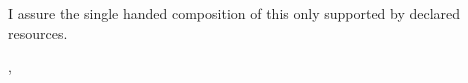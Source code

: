 \thispagestyle{empty}
\vspace*{0.8\textheight}
\noindent
I assure the single handed composition of this \MakeLowercase{\getDoctype{}} only supported by declared resources.

\vspace{15mm}
\noindent
\getSubmissionLocation{}, \getSubmissionDate{} \hspace{5cm} \getAuthor{}

\cleardoublepage{}
